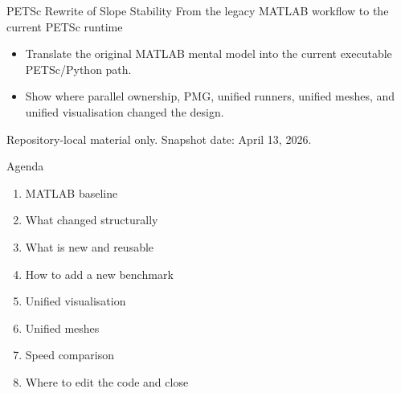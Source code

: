 \documentclass[aspectratio=169,10pt]{beamer}
\begin{document}
\TitleFrame
  {PETSc Rewrite of Slope Stability}
  {From the legacy MATLAB workflow to the current PETSc runtime}
  {
    \begin{itemize}
      \item Translate the original MATLAB mental model into the current executable PETSc/Python path.
      \item Show where parallel ownership, PMG, unified runners, unified meshes, and unified visualisation changed the design.
    \end{itemize}
  }
  {Repository-local material only. Snapshot date: April 13, 2026.}

\begin{frame}{Agenda}
\small
\begin{softbox}
\begin{enumerate}
  \item MATLAB baseline
  \item What changed structurally
  \item What is new and reusable
  \item How to add a new benchmark
  \item Unified visualisation
  \item Unified meshes
  \item Speed comparison
  \item Where to edit the code and close
\end{enumerate}
\end{softbox}
\end{frame}
\end{document}
